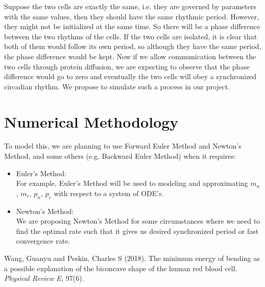 \documentclass[12pt]{article}
\renewcommand{\(}{\left (}
\renewcommand{\)}{\right )}
\begin{document}
Suppose the two cells are exactly the same, i.e. they are governed by parameters with the same values, then they should have the same rhythmic period. However, they might not be initialized at the same time. So there will be a phase difference between the two rhythms of the cells. If the two cells are isolated, it is clear that both of them would follow its own period, so although they have the same period, the phase difference would be kept. Now if we allow communication between the two cells through protein diffusion, we are expecting to observe that the phase difference would go to zero and eventually the two cells will obey a synchronized circadian rhythm. We propose to simulate such a process in our project.

\section{Numerical Methodology}
To model this, we are planning to use Forward Euler Method and Newton's Method, and some others (e.g. Backward Euler Method) when it requires:
\begin{itemize}
    \item Euler's Method:\\
    For example, Euler's Method will be used to modeling and approximating $m_n$, $m_c$, $p_n$, $p_c$ with respect to a system of ODE's.
    \item Newton's Method:\\
    We are proposing Newton's Method for some circumstances where we need to find the optimal rate such that it gives us desired synchronized period or fast convergence rate.
\end{itemize}




\begin{thebibliography}{9}

	Wang, Guanyu and Peskin, Charles S (2018).
	The minimum energy of bending as a possible explanation of the biconcave shape of the human red blood cell.
	\textit{Physical Review E,}
	97(6).


\end{thebibliography}
\end{document}
